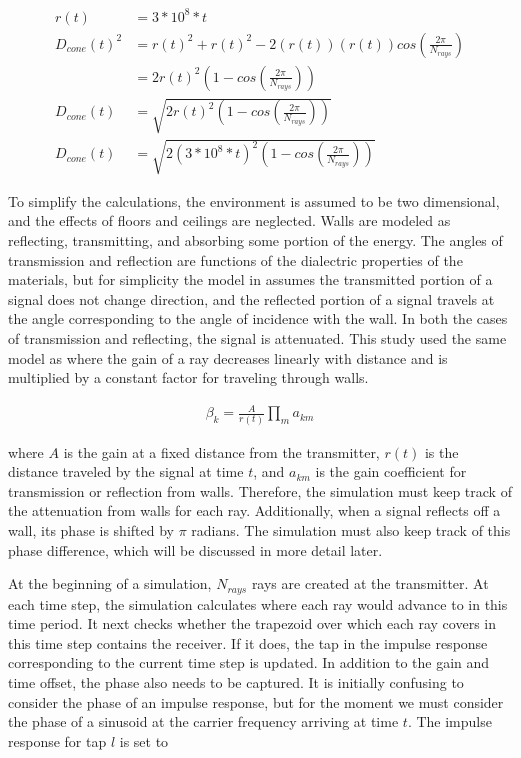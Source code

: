 \documentclass[article,11pt,onecolumn,final]{IEEEtran}
\begin{document}
\begin{align*}
r(t) &= 3*10^8 * t \\
D_{cone}(t)^2 &= r(t)^2 + r(t)^2 - 2(r(t))(r(t))cos(\frac{2 \pi}{N_{rays}}) \\
              &= 2r(t)^2(1 - cos(\frac{2 \pi}{N_{rays}})) \\
D_{cone}(t) &= \sqrt{2r(t)^2(1 - cos(\frac{2 \pi}{N_{rays}}))} \\
D_{cone}(t) &= \sqrt{2(3*10^8*t)^2(1 - cos(\frac{2 \pi}{N_{rays}}))}
\end{align*}

To simplify the calculations, the environment is assumed to be two dimensional, and the effects of floors and ceilings are neglected. Walls are modeled as reflecting, transmitting, and absorbing some portion of the energy. The angles of transmission and reflection are functions of the dialectric properties of the materials, but for simplicity the model in \cite{Holt} assumes the transmitted portion of a signal does not change direction, and the reflected portion of a signal travels at the angle corresponding to the angle of incidence with the wall. In both the cases of transmission and reflecting, the signal is attenuated. This study used the same model as \cite{Holt} where the gain of a ray decreases linearly with distance and is multiplied by a constant factor for traveling through walls.

\begin{align*}
 \beta_k = \frac{A}{r(t)} \prod_m a_{km} 
\end{align*}

where $A$ is the gain at a fixed distance from the transmitter, $r(t)$ is the distance traveled by the signal at time $t$, and $a_{km}$ is the gain coefficient for transmission or reflection from walls. Therefore, the simulation must keep track of the attenuation from walls for each ray. Additionally, when a signal reflects off a wall, its phase is shifted by $\pi$ radians. The simulation must also keep track of this phase difference, which will be discussed in more detail later.

At the beginning of a simulation, $N_{rays}$ rays are created at the transmitter. At each time step, the simulation calculates where each ray would advance to in this time period. It next checks whether the trapezoid over which each ray covers in this time step contains the receiver. If it does, the tap in the impulse response corresponding to the current time step is updated. In addition to the gain and time offset, the phase also needs to be captured. It is initially confusing to consider the phase of an impulse response, but for the moment we must consider the phase of a sinusoid at the carrier frequency arriving at time $t$. The impulse response for tap $l$ is set to 
\end{document}
